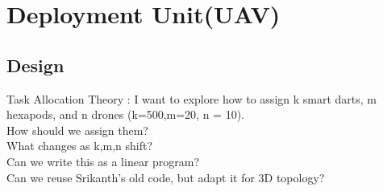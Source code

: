 \section{Deployment Unit(UAV)}\label{sec:DeploymentUnit(UAV)}

\subsection{Design}
Task Allocation Theory : I want to explore how to assign k smart darts, m hexapods, and n drones  (k=500,m=20, n = 10).\\  
How should we assign them?\\  
What changes as k,m,n shift?\\
Can we write this as a linear program?\\
Can we reuse Srikanth’s old code, but adapt it for 3D topology?\\
